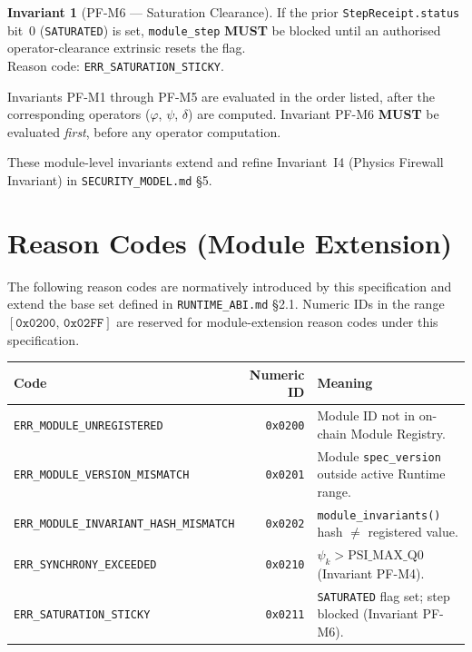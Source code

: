 \documentclass[11pt,letterpaper]{article}
\theoremstyle{definition}
\newtheorem{invariant}{Invariant}[section]
\newcommand{\MUST}{\textbf{MUST}}
\newcommand{\ph}{\varphi}       %
\newcommand{\sy}{\psi}          %
\newcommand{\dv}{\delta}        %
\begin{document}
\begin{invariant}[PF-M6 — Saturation Clearance]
\label{inv:pfm6}
If the prior \texttt{StepReceipt.status} bit~0 (\texttt{SATURATED}) is set, \texttt{module\_step} \MUST{} be blocked until an authorised operator-clearance extrinsic resets the flag. \\
Reason code: \texttt{ERR\_SATURATION\_STICKY}.
\end{invariant}

\noindent Invariants PF-M1 through PF-M5 are evaluated in the order listed, after the corresponding operators ($\ph$, $\sy$, $\dv$) are computed. Invariant PF-M6 \MUST{} be evaluated \emph{first}, before any operator computation.

These module-level invariants extend and refine Invariant~I4 (Physics Firewall Invariant) in \texttt{SECURITY\_MODEL.md} §5.

\section{Reason Codes (Module Extension)}
\label{sec:reasoncodes}

The following reason codes are normatively introduced by this specification and extend the base set defined in \texttt{RUNTIME\_ABI.md} §2.1. Numeric IDs in the range $[\mathtt{0x0200},\,\mathtt{0x02FF}]$ are reserved for module-extension reason codes under this specification.

\begin{center}
\begin{tabular}{lrl}
\toprule
\textbf{Code} & \textbf{Numeric ID} & \textbf{Meaning} \\
\midrule
\texttt{ERR\_MODULE\_UNREGISTERED}          & \texttt{0x0200} & Module ID not in on-chain Module Registry. \\
\texttt{ERR\_MODULE\_VERSION\_MISMATCH}     & \texttt{0x0201} & Module \texttt{spec\_version} outside active Runtime range. \\
\texttt{ERR\_MODULE\_INVARIANT\_HASH\_MISMATCH} & \texttt{0x0202} & \texttt{module\_invariants()} hash $\ne$ registered value. \\
\texttt{ERR\_SYNCHRONY\_EXCEEDED}           & \texttt{0x0210} & $\sy_k > \mathrm{PSI\_MAX\_Q0}$ (Invariant PF-M4). \\
\texttt{ERR\_SATURATION\_STICKY}            & \texttt{0x0211} & \texttt{SATURATED} flag set; step blocked (Invariant PF-M6). \\
\bottomrule
\end{tabular}
\end{center}
\end{document}
